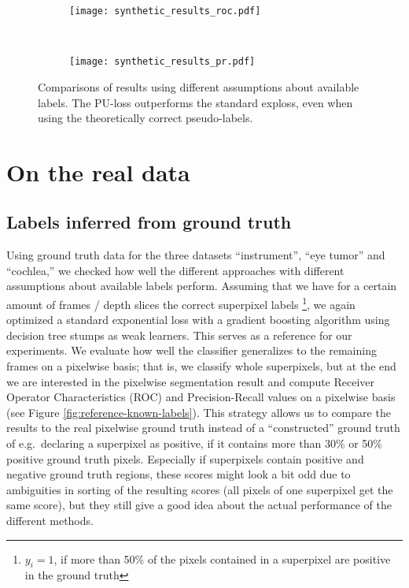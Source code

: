 \begin{figure}[ht]
	\centering
	\begin{subfigure}[h]{0.49\textwidth}
	\texttt{[image: synthetic\_results\_roc.pdf]}	
	\end{subfigure}
	~
	\begin{subfigure}[h]{0.49\textwidth}
	\texttt{[image: synthetic\_results\_pr.pdf]}	
	\end{subfigure}
	\caption{Comparisons of results using different assumptions about available labels. The PU-loss outperforms the standard exploss, even when using the theoretically correct pseudo-labels.}
	\label{fig:synthetic_results}
\end{figure}


\section{On the real data}
\subsection{Labels inferred from ground truth}
Using ground truth data for the three datasets ``instrument'', ``eye tumor'' and ``cochlea,'' we checked how well the different approaches with different assumptions about available labels perform. 
Assuming that we have for a certain amount of frames / depth slices the correct superpixel labels \footnote{$y_i = 1$, if more than 50\% of the pixels contained in a superpixel are positive in the ground truth}, we again optimized a standard exponential loss with a gradient boosting algorithm using decision tree stumps as weak learners. 
This serves as a reference for our experiments.
We evaluate how well the classifier generalizes to the remaining frames on a pixelwise basis; that is, we classify whole superpixels, but at the end we are interested in the pixelwise segmentation result and compute Receiver Operator Characteristics (ROC) and Precision-Recall values on a pixelwise basis (see Figure \ref{fig:reference-known-labels}). 
This strategy allows us to compare the results to the real pixelwise ground truth instead of a ``constructed'' ground truth of e.g.\ declaring a superpixel as positive, if it contains more than 30\% or 50\% positive ground truth pixels.
Especially if superpixels contain positive and negative ground truth regions, these scores might look a bit odd due to ambiguities in sorting of the resulting scores (all pixels of one superpixel get the same score), but they still give a good idea about the actual performance of the different methods. 


